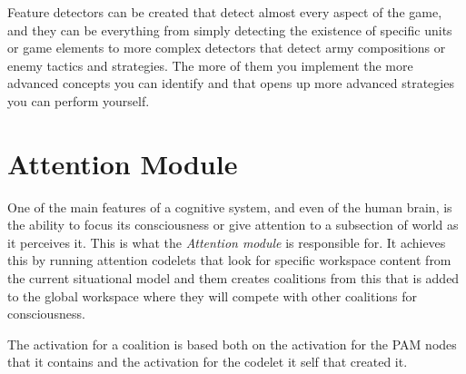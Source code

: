 Feature detectors can be created that detect almost every aspect of the game, and they can be everything from simply detecting the existence of specific units or game elements to more complex detectors that detect army compositions or enemy tactics and strategies. The more of them you implement the more advanced concepts you can identify and that opens up more advanced strategies you can perform yourself. 

\section{Attention Module}
One of the main features of a cognitive system, and even of the human brain, is the ability to focus its consciousness or give attention to a subsection of world as it perceives it. This is what the {\em Attention module} is responsible for. It achieves this by running attention codelets that look for specific workspace content from the current situational model and them creates coalitions from this that is added to the global workspace where they will compete with other coalitions for consciousness.

The activation for a coalition is based both on the activation for the PAM nodes that it contains and the activation for the codelet it self that created it. 

